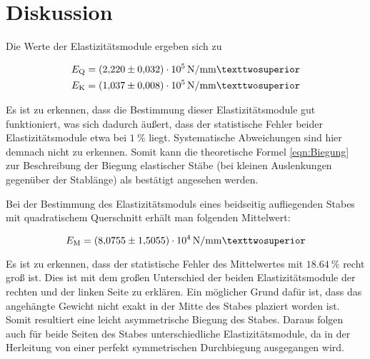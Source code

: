 \section{Diskussion}
\label{sec:Diskussion}

Die Werte der Elastizitätsmodule ergeben sich zu

\begin{align*}
E_\text{Q} &= \SI{2.220+-0.032e5}{\newton\per\milli\meter²}\\
E_\text{K} &= \SI{1.037+-0.008e5}{\newton\per\milli\meter²}
\end{align*}

Es ist zu erkennen, dass die Bestimmung dieser Elastizitätsmodule gut 
funktioniert, was sich dadurch äußert, dass der statistische Fehler
beider Elastizitätsmodule etwa bei $\SI{1}{\percent}$ liegt. 
Systematische Abweichungen sind hier demnach nicht zu erkennen. Somit 
kann die theoretische Formel \eqref{eqn:Biegung} zur Beschreibung 
der Biegung elastischer Stäbe (bei kleinen Auslenkungen gegenüber der
Stablänge) als bestätigt angesehen werden.

Bei der Bestimmung des Elastizitätsmoduls eines beidseitig aufliegenden
Stabes mit quadratischem Querschnitt erhält man folgenden Mittelwert: 

\begin{equation*}
E_\text{M} = \SI{8.0755+-1.5055e4}{\newton\per\milli\meter²}
\end{equation*}

Es ist zu erkennen, dass der statistische Fehler des Mittelwertes mit 
$\SI{18.64}{\percent}$ recht groß ist. Dies ist mit dem großen Unterschied
der beiden Elastizitätsmodule der rechten und der linken Seite zu 
erklären. Ein möglicher Grund dafür ist, dass das angehängte Gewicht
nicht exakt in der Mitte des Stabes plaziert worden ist. Somit resultiert
eine leicht asymmetrische Biegung des Stabes. Daraus folgen auch für beide
Seiten des Stabes unterschiedliche Elastizitätsmodule, da in der Herleitung
von einer perfekt symmetrischen Durchbiegung ausgegangen wird. 

